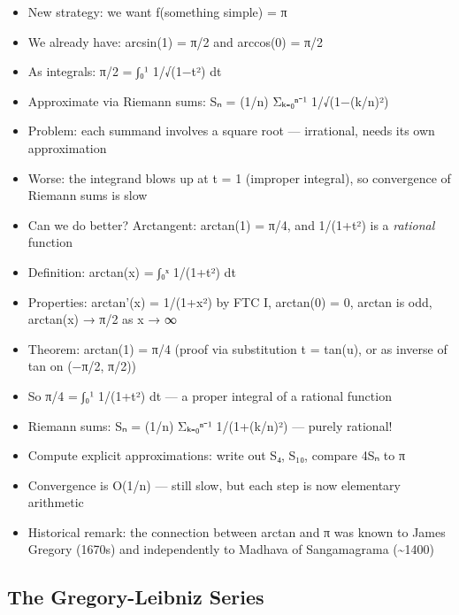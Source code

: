 \documentclass[
  10pt,
  letterpaper,
]{scrbook}
\providecommand{\tightlist}{%
  \setlength{\itemsep}{0pt}\setlength{\parskip}{0pt}}
\begin{document}
\begin{itemize}
\tightlist
\item
  New strategy: we want f(something simple) = π
\item
  We already have: arcsin(1) = π/2 and arccos(0) = π/2
\item
  As integrals: π/2 = ∫₀¹ 1/√(1−t²) dt
\item
  Approximate via Riemann sums: Sₙ = (1/n) Σₖ₌₀ⁿ⁻¹ 1/√(1−(k/n)²)
\item
  Problem: each summand involves a square root --- irrational, needs its
  own approximation
\item
  Worse: the integrand blows up at t = 1 (improper integral), so
  convergence of Riemann sums is slow
\item
  Can we do better? Arctangent: arctan(1) = π/4, and 1/(1+t²) is a
  \emph{rational} function
\item
  Definition: arctan(x) = ∫₀ˣ 1/(1+t²) dt
\item
  Properties: arctan'(x) = 1/(1+x²) by FTC I, arctan(0) = 0, arctan is
  odd, arctan(x) → π/2 as x → ∞
\item
  Theorem: arctan(1) = π/4 (proof via substitution t = tan(u), or as
  inverse of tan on (−π/2, π/2))
\item
  So π/4 = ∫₀¹ 1/(1+t²) dt --- a proper integral of a rational function
\item
  Riemann sums: Sₙ = (1/n) Σₖ₌₀ⁿ⁻¹ 1/(1+(k/n)²) --- purely rational!
\item
  Compute explicit approximations: write out S₄, S₁₀, compare 4Sₙ to π
\item
  Convergence is O(1/n) --- still slow, but each step is now elementary
  arithmetic
\item
  Historical remark: the connection between arctan and π was known to
  James Gregory (1670s) and independently to Madhava of Sangamagrama
  (\textasciitilde1400)
\end{itemize}

\subsection{The Gregory-Leibniz
Series}\label{the-gregory-leibniz-series}
\end{document}
